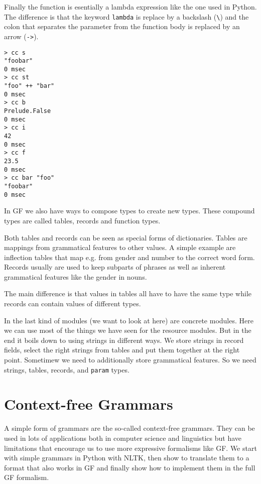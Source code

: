 \documentclass{scrartcl}
\begin{document}
Finally the function is esentially a lambda expression like the one used in Python. The difference is that the keyword \texttt{lambda} is replace by a backslash (\texttt{\textbackslash}) and the colon that separates the parameter from the function body is replaced by an arrow (\texttt{->}).

\begin{verbatim}
> cc s
"foobar"
0 msec
> cc st
"foo" ++ "bar"
0 msec
> cc b
Prelude.False
0 msec
> cc i
42
0 msec
> cc f
23.5
0 msec
> cc bar "foo"
"foobar"
0 msec
\end{verbatim}

In GF we also have ways to compose types to create new types. These compound types are called tables, records and function types.

Both tables and records can be seen as special forms of dictionaries. Tables are mappings from grammatical features to other values. A simple example are inflection tables that map e.g. from gender and number to the correct word form. Records usually are used to keep subparts of phrases as well as inherent grammatical features like the gender in nouns.

The main difference is that values in tables all have to have the same type while records can contain values of different types.

In the last kind of modules (we want to look at here) are concrete modules. Here we can use most of the things we have seen for the resource modules. But in the end it boils down to using strings in different ways. We store strings in record fields, select the right strings from tables and put them together at the right point. Sometimew we need to additionally store grammatical features. So we need strings, tables, records, and \texttt{param} types.

\section{Context-free Grammars}

A simple form of grammars are the so-called context-free grammars. They can be used in lots of applications both in computer science and linguistics but have limitations that encourage us to use more expressive formalisms like GF. We start with simple grammars in Python with NLTK, then show to translate them to a format that also works in GF and finally show how to implement them in the full GF formalism.
\end{document}
